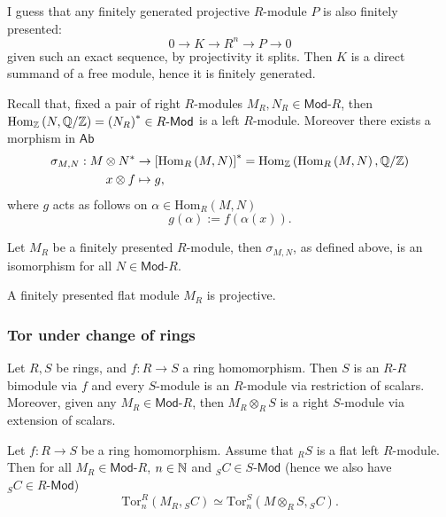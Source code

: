 \begin{rem}
	I guess that any finitely generated projective $R$-module $P$ is also finitely presented:
	\begin{equation}
		0 \to K \to R^n \to P \to 0
	\end{equation} 
	given such an exact sequence, by projectivity it splits.
	Then $K$ is a direct summand of a free module, hence it is finitely generated.
\end{rem}


\begin{rem}[]
	Recall that, fixed a pair of right $R$-modules $M_R, N_R \in \mathsf{Mod}\text{-}R$,
	then $\mathrm{Hom}_{\mathbb{Z}}\left( N, \mathbb{Q}/\mathbb{Z} \right) = 
	\left( N_R \right)^* \in R\text{-}\mathsf{Mod}$ is a left $R$-module.
	Moreover there exists a morphism in $\mathsf{Ab}$
	\begin{align}
		\sigma_{M,N}: M \otimes N^* &\to \left[ \mathrm{Hom}_{R}\left( M, N \right) \right]^* 
		= \mathrm{Hom}_{\mathbb{Z}}\left( \mathrm{Hom}_{ R}\left( M, N \right), \mathbb{Q}/\mathbb{Z} \right)\\
		x \otimes f &\mapsto g
	,\end{align} 
	where $g$ acts as follows on $\alpha \in \mathrm{Hom}_{R}\left( M, N \right)$
	\begin{equation}
		g(\alpha) := f \left( \alpha(x) \right)
	.\end{equation} 
\end{rem}

\begin{lem}
	Let $M_R$ be a finitely presented $R$-module,
	then $\sigma_{M,N}$, as defined above, is an isomorphism for all $N \in \mathsf{Mod}\text{-}R$.
\end{lem} 

\begin{thm}[]
	A finitely presented flat module $M_R$ is projective.
\end{thm}

\subsubsection{Tor under change of rings}
Let $R,S$ be rings, and $f: R \to S$ a ring homomorphism.
Then $S$ is an $R$-$R$ bimodule via $f$ and every $S$-module
is an $R$-module via restriction of scalars.
Moreover, given any $M_R \in \mathsf{Mod}\text{-}R$, then
$M_R \otimes_R S$ is a right $S$-module via extension of scalars.

\begin{prop}
	Let $f: R \to S$ be a ring homomorphism.
	Assume that ${}_RS$ is a flat left $R$-module.
	Then for all $M_R \in \mathsf{Mod}\text{-}R$, $n \in \mathbb{N}$ and ${}_SC \in S\text{-}\mathsf{Mod}$
	(hence we also have ${}_SC \in R\text{-}\mathsf{Mod}$)
	\begin{equation}
		\mathrm{Tor}^R_n (M_R, {}_SC) \simeq
		\mathrm{Tor}^S_n (M \otimes_R S, {}_SC)
	.\end{equation} 
\end{prop} 

